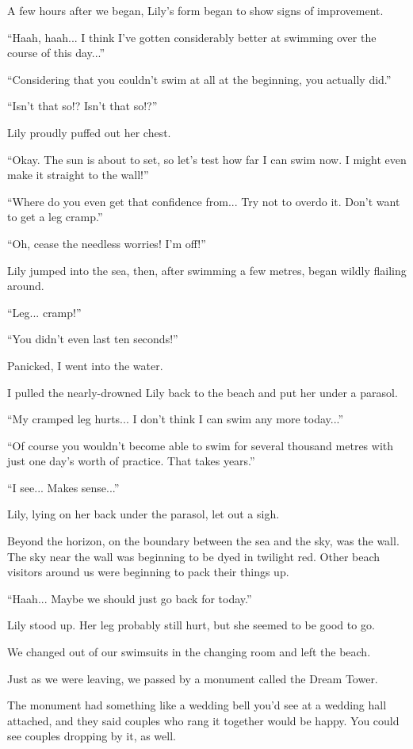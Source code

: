 A few hours after we began, Lily's form began to show signs of improvement.

``Haah, haah... I think I've gotten considerably better at swimming over the course of this day...''

``Considering that you couldn't swim at all at the beginning, you actually did.''

``Isn't that so!? Isn't that so!?''

Lily proudly puffed out her chest.

``Okay. The sun is about to set, so let's test how far I can swim now. I might even make it straight to the wall!''

``Where do you even get that confidence from... Try not to overdo it. Don't want to get a leg cramp.''

``Oh, cease the needless worries! I'm off!''

Lily jumped into the sea, then, after swimming a few metres, began wildly flailing around.

``Leg... cramp!''

``You didn't even last ten seconds!''

Panicked, I went into the water.

I pulled the nearly-drowned Lily back to the beach and put her under a parasol.

``My cramped leg hurts... I don't think I can swim any more today...''

``Of course you wouldn't become able to swim for several thousand metres with just one day's worth of practice. That takes years.''

``I see... Makes sense...''

Lily, lying on her back under the parasol, let out a sigh.

Beyond the horizon, on the boundary between the sea and the sky, was the wall. The sky near the wall was beginning to be dyed in twilight red. Other beach visitors around us were beginning to pack their things up.

``Haah... Maybe we should just go back for today.''

Lily stood up. Her leg probably still hurt, but she seemed to be good to go.

We changed out of our swimsuits in the changing room and left the beach.

Just as we were leaving, we passed by a monument called the Dream Tower.

The monument had something like a wedding bell you'd see at a wedding hall attached, and they said couples who rang it together would be happy. You could see couples dropping by it, as well.


